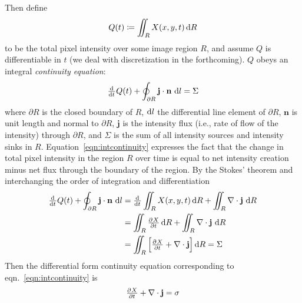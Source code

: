 \noindent Then define
\begin{equation*}
	Q(t) \coloneqq \iint_R X(x,y,t) \dif R
\end{equation*}
to be the total pixel intensity over some image region \(R\), and assume \(Q\) is differentiable in \(t\) (we deal with discretization in the forthcoming).
%
\(Q\) obeys an integral \textit{continuity equation}:
\begin{equation}
	\od{}{t} Q(t) + \oint_{\partial R} \mathbf{j} \cdot \mathbf{n}\, \dif l = \Sigma
	\label{eqn:intcontinuity}
\end{equation}
where \(\partial R\) is the closed boundary of \(R\), \(\dif l\) the differential line element of \(\partial R\), \(\mathbf{n}\) is unit length and normal to \(\partial R\), \(\mathbf{j}\) is the intensity flux (i.e., rate of flow of the intensity) through \(\partial R\), and \(\Sigma\) is the sum of all intensity sources and intensity sinks in \(R\).
%
Equation~\eqref{eqn:intcontinuity} expresses the fact that the change in total pixel intensity in the region \(R\) over time is equal to net intensity creation minus net flux through the boundary of the region.
%
By the Stokes' theorem and interchanging the order of integration and differentiation
\begin{align*}
	\od{}{t} Q(t) + \oint_{\partial R} \mathbf{j} \cdot \mathbf{n}\, \dif l & = \od{}{t} \iint_R X(x,y,t) \dif R + \iint_R \nabla \cdot \mathbf{j}\, \dif R \\
	& = \iint_R \pd{X}{t} \dif R + \iint_R \nabla \cdot \mathbf{j}\, \dif R         \\
	& = \iint_R \left[ \pd{X}{t} + \nabla \cdot \mathbf{j} \right]  \dif R = \Sigma
\end{align*}
Then the differential form continuity equation corresponding to eqn.~\eqref{eqn:intcontinuity} is
\begin{equation}
	\pd{X}{t} + \nabla \cdot \mathbf{j} = \sigma
	\label{eqn:diffcontinuity}
\end{equation}
